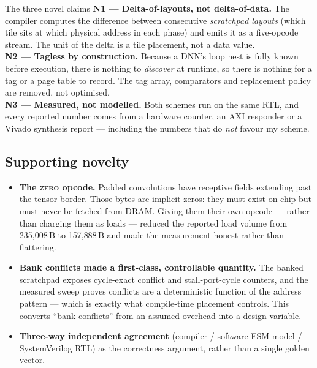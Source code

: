 \documentclass[11pt,a4paper]{article}
\newcommand{\op}[1]{\textsc{#1}}
\begin{document}
\begin{keybox}{The three novel claims}
\textbf{N1 --- Delta-of-layouts, not delta-of-data.} The compiler computes
the difference between consecutive \emph{scratchpad layouts} (which tile sits
at which physical address in each phase) and emits it as a five-opcode stream.
The unit of the delta is a tile placement, not a data value.\\[4pt]
\textbf{N2 --- Tagless by construction.} Because a DNN's loop nest is fully
known before execution, there is nothing to \emph{discover} at runtime, so
there is nothing for a tag or a page table to record. The tag array,
comparators and replacement policy are removed, not optimised.\\[4pt]
\textbf{N3 --- Measured, not modelled.} Both schemes run on the same RTL, and
every reported number comes from a hardware counter, an AXI responder or a
Vivado synthesis report --- including the numbers that do \emph{not} favour my
scheme.
\end{keybox}

\subsection{Supporting novelty}

\begin{itemize}[leftmargin=1.5em,itemsep=3pt]
  \item \textbf{The \op{zero} opcode.} Padded convolutions have receptive
        fields extending past the tensor border. Those bytes are implicit
        zeros: they must exist on-chip but must never be fetched from DRAM.
        Giving them their own opcode --- rather than charging them as loads ---
        reduced the reported load volume from 235{,}008\,B to 157{,}888\,B and
        made the measurement honest rather than flattering.
  \item \textbf{Bank conflicts made a first-class, controllable quantity.}
        The banked scratchpad exposes cycle-exact conflict and stall-port-cycle
        counters, and the measured sweep proves conflicts are a deterministic
        function of the address pattern --- which is exactly what compile-time
        placement controls. This converts ``bank conflicts'' from an assumed
        overhead into a design variable.
  \item \textbf{Three-way independent agreement} (compiler / software FSM
        model / SystemVerilog RTL) as the correctness argument, rather than a
        single golden vector.
\end{itemize}
\end{document}

